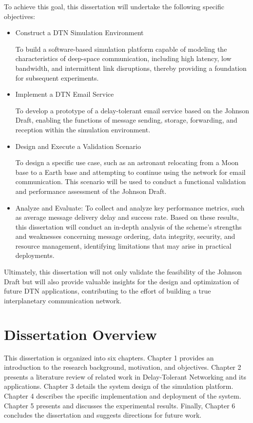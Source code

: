 To achieve this goal, this dissertation will undertake the following specific objectives:

\begin{itemize}
  \item Construct a DTN Simulation Environment
  
  To build a software-based simulation platform capable of modeling the characteristics of deep-space communication, including high latency, low bandwidth, and intermittent link disruptions, thereby providing a foundation for subsequent experiments.

  \item Implement a DTN Email Service
  
  To develop a prototype of a delay-tolerant email service based on the Johnson Draft, enabling the functions of message sending, storage, forwarding, and reception within the simulation environment.

  \item Design and Execute a Validation Scenario
  
  To design a specific use case, such as an astronaut relocating from a Moon base to a Earth base and attempting to continue using the network for email communication. This scenario will be used to conduct a functional validation and performance assessment of the Johnson Draft.

  \item Analyze and Evaluate: To collect and analyze key performance metrics, such as average message delivery delay and success rate. Based on these results, this dissertation will conduct an in-depth analysis of the scheme's strengths and weaknesses concerning message ordering, data integrity, security, and resource management, identifying limitations that may arise in practical deployments.
\end{itemize}

Ultimately, this dissertation will not only validate the feasibility of the Johnson Draft but will also provide valuable insights for the design and optimization of future DTN applications, contributing to the effort of building a true interplanetary communication network.

\section{Dissertation Overview}
This dissertation is organized into six chapters. Chapter 1 provides an introduction to the research background, motivation, and objectives. Chapter 2 presents a literature review of related work in Delay-Tolerant Networking and its applications. Chapter 3 details the system design of the simulation platform. Chapter 4 describes the specific implementation and deployment of the system. Chapter 5 presents and discusses the experimental results. Finally, Chapter 6 concludes the dissertation and suggests directions for future work.